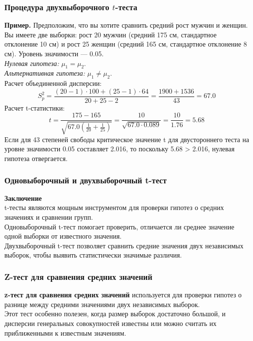 \documentclass[aspectratio=169]{beamer}
\begin{document}
\begin{frame}
\frametitle{Процедура двухвыборочного $t$-теста}
{\bf Пример.} Предположим, что вы хотите сравнить средний рост мужчин и женщин. Вы имеете две выборки: рост 20 мужчин (средний 175 см, стандартное отклонение 10 см) и рост 25 женщин (средний 165 см, стандартное отклонение 8 см). Уровень значимости — 0.05.\\
{\it Нулевая гипотеза:} \( \mu_1 = \mu_2 \).\\
{\it Альтернативная гипотеза:} \( \mu_1 \ne \mu_2 \).\\
Расчет объединенной дисперсии:
\[
S_p^2 = \frac{(20 - 1) \cdot 100 + (25 - 1) \cdot 64}{20 + 25 - 2} = \frac{1900 + 1536}{43} = 67.0
\]
Расчет t-статистики:
\[
t = \frac{175 - 165}{\sqrt{67.0 \left(\frac{1}{20} + \frac{1}{25}\right)}} = \frac{10}{\sqrt{67.0 \cdot 0.089}} = \frac{10}{1.76} = 5.68
\]
Если для 43 степеней свободы критическое значение t для двустороннего теста на уровне значимости 0.05 составляет 2.016, то поскольку 5.68 > 2.016, нулевая гипотеза отвергается.
\end{frame}

\begin{frame}
\frametitle{Одновыборочный и двухвыборочный t-тест}
{\bf Заключение}
\newline\\
t-тесты являются мощным инструментом для проверки гипотез о средних значениях и сравнении групп.\\
Одновыборочный t-тест помогает проверить, отличается ли среднее значение одной выборки от известного значения.\\
Двухвыборочный t-тест позволяет сравнить средние значения двух независимых выборок, чтобы выявить статистически значимые различия.
\end{frame}

\begin{frame}
\frametitle{Z-тест для сравнения средних значений}
{\bf z-тест для сравнения средних значений} используется для проверки гипотез о разнице между средними значениями двух независимых выборок.\\
Этот тест особенно полезен, когда размер выборок достаточно большой, и дисперсии генеральных совокупностей известны или можно считать их приближенными к известным значениям.
\end{frame}
\end{document}
